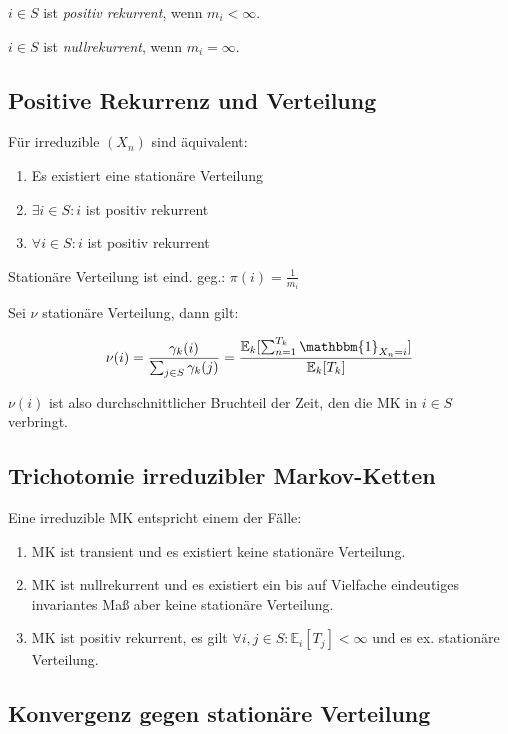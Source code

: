 $i \in S$ ist \emph{positiv rekurrent}, wenn $m_i < \infty$.

$i \in S$ ist \emph{nullrekurrent}, wenn $m_i = \infty$.

\subsection*{Positive Rekurrenz und Verteilung}

Für irreduzible $(X_n)$ sind äquivalent:

\begin{enumerate}[label=(\alph*)]
	\item Es existiert eine stationäre Verteilung
	\item $\exists i \in S : i$ ist positiv rekurrent
	\item $\forall i \in S : i$ ist positiv rekurrent
\end{enumerate}

Stationäre Verteilung ist eind. geg.: $\pi(i) = \frac{1}{m_i}$

Sei $\nu$ stationäre Verteilung, dann gilt:

\[ \nu(i) = \frac{\gamma_k(i)}{\sum_{j \in S} \gamma_k(j)} = \frac{\mathbb{E}_k[\sum_{n=1}^{T_k} \mathbbm{1}_{X_n = i}]}{\mathbb{E}_k[T_k]} \]

$\nu(i)$ ist also durchschnittlicher Bruchteil der Zeit, den die MK in $i \in S$ verbringt.

\subsection*{Trichotomie irreduzibler Markov-Ketten}

Eine irreduzible MK entspricht einem der Fälle:

\begin{enumerate}[label=(\alph*)]
	\item MK ist transient und es existiert keine stationäre Verteilung.
	\item MK ist nullrekurrent und es existiert ein bis auf Vielfache eindeutiges invariantes Maß aber keine stationäre Verteilung.
	\item MK ist positiv rekurrent, es gilt $\forall i, j \in S : \mathbb{E}_i[T_j] < \infty$ und es ex. stationäre Verteilung.
\end{enumerate}

\subsection*{Konvergenz gegen stationäre Verteilung}

